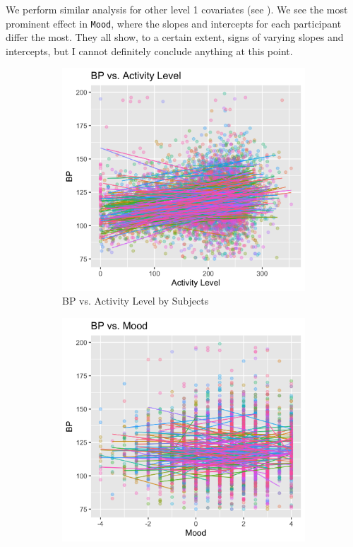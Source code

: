 \documentclass[12pt,twoside,letterpaper]{article}
\theoremstyle{definition}
\theoremstyle{definition}
\begin{document}
We perform similar analysis for other level 1 covariates (see ). We see the most prominent effect in \texttt{Mood}, where the slopes and intercepts for each participant differ the most. They all show, to a certain extent, signs of varying slopes and intercepts, but I cannot definitely conclude anything at this point.

\begin{figure} 
    \centering
    \begin{subfigure}[b]{0.32\textwidth}
    \centering
    \includegraphics[width=\textwidth]{pics/bp v act.png}
    \caption[]%
    {{\small BP vs. Activity Level by Subjects}}
    \label{fig: bp v act}
    \end{subfigure}
    \hfill
    \begin{subfigure}[b]{0.32\textwidth}
    \centering
    \includegraphics[width=\textwidth]{pics/bp v mood.png}

\end{subfigure}
\end{figure}
\end{document}
